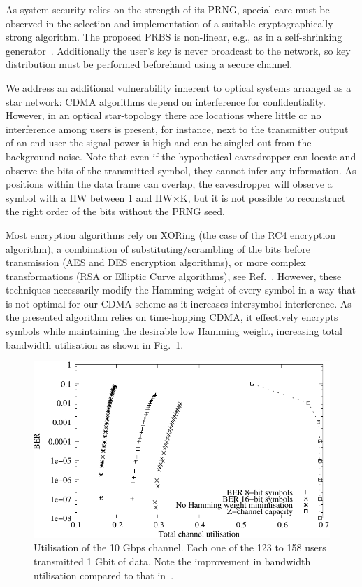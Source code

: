 \documentclass[a4paper,10pt]{report}
\begin{document}
As system security relies on the strength of its PRNG, special care must be observed in the selection and implementation of a suitable cryptographically strong algorithm.
The proposed PRBS is non-linear, e.g., as in a self-shrinking generator~\cite{Meier:94}.
Additionally the user's key is never broadcast to the network, so key distribution must be performed beforehand using a secure channel.

We address an additional vulnerability inherent to optical systems arranged as a star network: CDMA algorithms depend on interference for confidentiality.
However, in an optical star-topology there are locations where little or no interference among users is present, for instance, next to the transmitter output of an end user the signal power is high and can be singled out from the background noise.
Note that even if the hypothetical eavesdropper can locate and observe the bits of the transmitted symbol, they cannot infer any information.
As positions within the data frame can overlap, the eavesdropper will observe a symbol with a HW between 1 and HW$\times$K, but it is not possible to reconstruct the right order of the bits without the PRNG seed.

Most encryption algorithms rely on XORing (the case of the RC4 encryption algorithm), a combination of substituting/scrambling of the bits before transmission (AES and DES encryption algorithms), or more complex transformations (RSA or Elliptic Curve algorithms), see Ref.~\cite{Menezes:1996:HAC:548089}.
However, these techniques necessarily modify the Hamming weight of every symbol in a way that is not optimal for our CDMA scheme as it increases intersymbol interference.
As the presented algorithm relies on time-hopping CDMA, it effectively encrypts symbols while maintaining the desirable low Hamming weight, increasing total bandwidth utilisation as shown in Fig.~\ref{fig_use}.

\begin{figure}[t]
  \centering
  \includegraphics[width=0.48 \textwidth]{BERvsChannel} 
  \caption{Utilisation of the 10 Gbps channel. Each one of the 123 to 158 users transmitted 1 Gbit of data. Note the improvement in bandwidth utilisation compared to that in~\cite{ortega11}.}
  \label{fig_use}
\end{figure}
\end{document}
